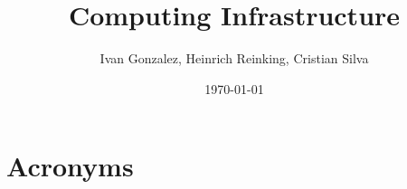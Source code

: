 \documentclass[PMO,authoryear,toc]{lsstdoc}
\title{Computing Infrastructure}
\author{%
Ivan Gonzalez, Heinrich Reinking, Cristian Silva
}
\date{\today}
\begin{document}
\maketitle





\appendix
\renewcommand{\refname}{} %


\newpage
\section{Acronyms} \label{sec:acronyms}

\end{document}
